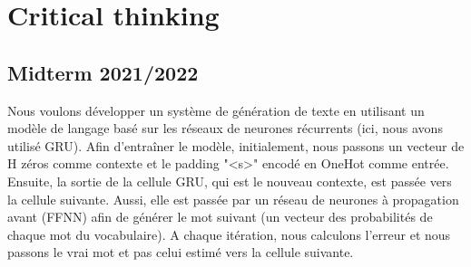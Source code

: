 \documentclass{../extra/aakpract/aakpract}
\begin{document}
	
	\maketitle
	
	\begin{center}
		\begin{minipage}{0.85\textwidth}
			\small\itshape
%			
%	
		\end{minipage}
	\end{center}
	
	\section{Critical thinking}
	
	\subsection{Midterm 2021/2022}
	
	Nous voulons développer un système de génération de texte en utilisant un modèle de langage basé sur les réseaux de neurones récurrents (ici, nous avons utilisé GRU). Afin d'entraîner le modèle, initialement, nous passons un vecteur de H zéros comme contexte et le padding "<s>" encodé en OneHot comme entrée. Ensuite, la sortie de la cellule GRU, qui est le nouveau contexte, est passée vers la cellule suivante. Aussi, elle est passée par un réseau de neurones à propagation avant (FFNN) afin de générer le mot suivant (un vecteur des probabilités de chaque mot du vocabulaire). A chaque itération, nous calculons l'erreur et nous passons le vrai mot et pas celui estimé vers la cellule suivante.
	
\end{document}
